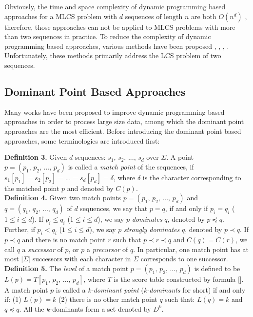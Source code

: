 \documentclass{article}
\begin{document}
Obviously, the time and space complexity of dynamic programming based
approaches for a MLCS problem with $d$ sequences of length $n$ are
both $O(n^d)$ \cite{Hsu1984}, therefore, those approaches can not be
applied to MLCS problems with more than two sequences in practice. To
reduce the complexity of dynamic programming based approaches, various
methods have been proposed \cite{Hirschberg1977},
\cite{Apostolico1992}, \cite{Masek1980},
\cite{Rick1994}. Unfortunately, these methods primarily address the
LCS problem of two sequences.

\subsection{Dominant Point Based Approaches}
\label{sec:Dominant Point}

Many works have been proposed to improve dynamic programming based
approaches in order to process large size data, among which the
dominant point approaches are the most efficient. Before introducing
the dominant point based approaches, some terminologies are introduced
first:

\textbf{Definition 3.} Given $d$ sequences: $s_1,\, s_2,\, ...,\, s_d$
over $\Sigma$. A point $p = (p_1,\, p_2,\, ...,\, p_d)$ is called a
\emph{match point} of the sequences, if $s_1[p_1] = s_2[p_2] = ... =
s_d[p_d] = \delta$, where $\delta$ is the character corresponding to
the matched point $p$ and denoted by $C(p)$.\\

\textbf{Definition 4.} Given two match points $p = (p_1,\, p_2,\,
...,\, p_d)$ and $q = (q_1,\, q_2,\, ...,\, q_d)$ of $d$ sequences, we
say that $p = q$, if and only if $p_i = q_i$ ($1 \leq i \leq d$). If
$p_i \leq q_i$ ($1 \leq i \leq d$), we say $p$ \emph{dominates} $q$,
denoted by $p \preceq q$. Further, if $p_i < q_i$ ($1 \leq i \leq d$),
we say $p$ \emph{strongly dominates} $q$, denoted by $p \prec q$.  If
$p \prec q$ and there is no match point $r$ such that $p \prec r \prec
q$ and $C(q) = C(r)$, we call $q$ a \emph{successor} of $p$, or $p$ a
\emph{precursor} of $q$. In particular, one match point has at most
$|\Sigma|$ successors with each character in $\Sigma$ corresponds to
one successor. \\

\textbf{Definition 5.} The \emph{level} of a match point $p = (p_1,\,
p_2,\, ...,\, p_d)$ is defined to be $L(p) = T[p_1,\, p_2,\, ...,\,
p_d]$, where $T$ is the score table constructed by formula []. A match
point $p$ is called a \emph{k-dominant point} (\emph{k-dominants} for
short) if and only if: (1) $L(p) = k$ (2) there is no other match
point $q$ such that: $L(q) = k$ and $q \preceq q$. All the
$k$-dominants form a set denoted by $D^k$.
\end{document}
